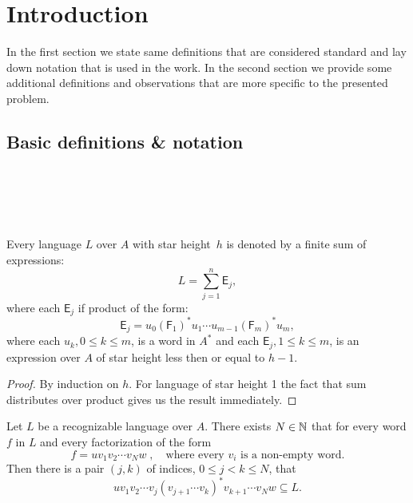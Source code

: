 \chapter{Introduction}

In the first section we state same definitions that are considered standard and lay down notation that is used in the work. In the second section we provide some additional definitions and observations that are more specific to the presented problem.

\section{Basic definitions \& notation}

\begin{defn} \\
    \\
\end{defn}

\begin{defn} \\
\end{defn}

\begin{defn}
\end{defn}

\begin{lemma}\label{lm:distributivity}
    Every language $L$ over $A$ with star height~$h$ is denoted by a finite sum of expressions:
    \[
        L = \sum_{j=1}^n \mathsf{E}_j,
    \]
    where each $\mathsf{E}_j$ if product of the form:
    \[
        \mathsf{E}_j = u_0{(\mathsf{F}_1)}^*u_1 \dotsm u_{m-1}{(\mathsf{F}_m)}^*u_m,
    \]
    where each $u_k, 0 \leq k \leq m$, is a word in $A^*$ and each $\mathsf{E}_j, 1 \leq k \leq m$, is an expression over $A$ of star height less then or equal to $h-1$.
\end{lemma}

\begin{proof}
    By induction on $h$. For language of star height 1 the fact that sum distributes over product gives us the result immediately. 
\end{proof}

\begin{lemma}\label{lm:block_star_lemma}
    Let $L$ be a recognizable language over $A$. There exists $N \in \mathbb{N}$ that for every word $f$ in $L$ and every factorization of the form
    \[
        f = u v_1 v_2 \dotsm v_N w \; , \quad \text{where every $v_i$ is a non-empty word.}
    \]
    Then there is a pair $(j,k)$ of indices, $0 \leq j < k \leq N$, that
    \[
        u v_1 v_2 \dotsm v_j {(v_{j+1} \dotsm v_k)}^* v_{k+1} \dotsm v_N w \subseteq L.
    \]
\end{lemma}

